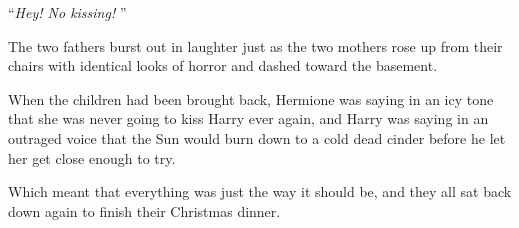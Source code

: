 ``\emph{Hey! No kissing!} ''

The two fathers burst out in laughter just as the two mothers rose up
from their chairs with identical looks of horror and dashed toward the
basement.

When the children had been brought back, Hermione was saying in an icy
tone that she was never going to kiss Harry ever again, and Harry was
saying in an outraged voice that the Sun would burn down to a cold dead
cinder before he let her get close enough to try.

Which meant that everything was just the way it should be, and they all
sat back down again to finish their Christmas dinner.
